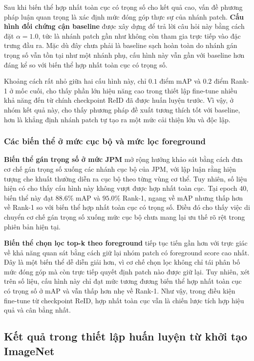 Sau khi biến thể hợp nhất toàn cục có trọng số cho kết quả cao, vấn đề phương pháp luận quan trọng là xác định mức đóng góp thực sự của nhánh patch. \textbf{Cấu hình đối chứng cận baseline} được xây dựng để trả lời câu hỏi này bằng cách đặt \(\alpha=1.0\), tức là nhánh patch gần như không còn tham gia trực tiếp vào đặc trưng đầu ra. Mặc dù đây chưa phải là baseline sạch hoàn toàn do nhánh gán trọng số vẫn tồn tại như một nhánh phụ, cấu hình này vẫn gần với baseline hơn đáng kể so với biến thể hợp nhất toàn cục có trọng số.

Khoảng cách rất nhỏ giữa hai cấu hình này, chỉ $0.1$ điểm mAP và $0.2$ điểm Rank-1 ở mốc cuối, cho thấy phần lớn hiệu năng cao trong thiết lập fine-tune nhiều khả năng đến từ chính checkpoint ReID đã được huấn luyện trước. Vì vậy, ở nhóm kết quả này, cho thấy phương pháp đề xuất tương thích tốt với baseline, hơn là khẳng định nhánh patch tự tạo ra một mức cải thiện lớn và độc lập.

\subsubsection{Các biến thể ở mức cục bộ và mức lọc foreground}

\textbf{Biến thể gán trọng số ở mức JPM} mở rộng hướng khảo sát bằng cách đưa cơ chế gán trọng số xuống các nhánh cục bộ của JPM, với lập luận rằng hiện tượng che khuất thường diễn ra cục bộ theo từng vùng cơ thể. Tuy nhiên, số liệu hiện có cho thấy cấu hình này không vượt được hợp nhất toàn cục. Tại epoch $40$, biến thể này đạt $88.6\%$ mAP và $95.0\%$ Rank-1, ngang về mAP nhưng thấp hơn về Rank-1 so với biến thể hợp nhất toàn cục có trọng số. Điều đó cho thấy việc di chuyển cơ chế gán trọng số xuống mức cục bộ chưa mang lại ưu thế rõ rệt trong phiên bản hiện tại.

\textbf{Biến thể chọn lọc top-k theo foreground} tiếp tục tiến gần hơn với trực giác về khả năng quan sát bằng cách giữ lại nhóm patch có foreground score cao nhất. Đây là một biến thể dễ diễn giải hơn, vì cơ chế chọn lọc không chỉ tái phân bố mức đóng góp mà còn trực tiếp quyết định patch nào được giữ lại. Tuy nhiên, xét trên số liệu, cấu hình này chỉ đạt mức tương đương biến thể hợp nhất toàn cục có trọng số ở mAP và vẫn thấp hơn nhẹ về Rank-1. Như vậy, trong điều kiện fine-tune từ checkpoint ReID, hợp nhất toàn cục vẫn là chiến lược tích hợp hiệu quả và cân bằng nhất.

\subsection{Kết quả trong thiết lập huấn luyện từ khởi tạo ImageNet}

